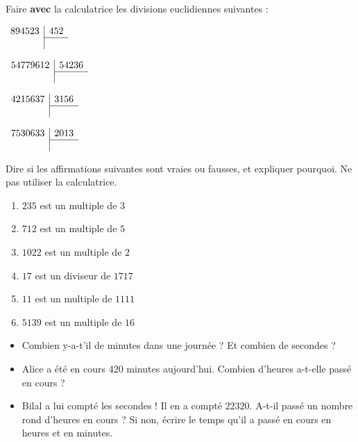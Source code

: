 \documentclass[a4paper,12pt]{article}
\begin{document}
\begin{exercice}
	Faire \textbf{avec} la calculatrice les divisions euclidiennes suivantes :
	\begin{enumerate}
		\begin{minipage}{0.45\linewidth}
			\item $\begin{array}{r|r}
					894523 & 452 \\
					\cline{2-2}
					       &
				\end{array}$
			\item $\begin{array}{r|r}
					54779612 & 54236 \\
					\cline{2-2}
					         &
				\end{array}$
		\end{minipage}
		\begin{minipage}{0.45\linewidth}
			\item $\begin{array}{r|r}
					4215637 & 3156 \\
					\cline{2-2}
					        &
				\end{array}$
			\item $\begin{array}{r|r}
					7530633 & 2013 \\
					\cline{2-2}
					        &
				\end{array}$
		\end{minipage}
	\end{enumerate}
\end{exercice}

\begin{exercice}
	Dire si les affirmations suivantes sont vraies ou fausses, et expliquer pourquoi. Ne pas utiliser la calculatrice.
	\begin{enumerate}
		\item $235$ est un multiple de $3$
		\item $712$ est un multiple de $5$
		\item $1022$ est un multiple de $2$
		\item $17$ est un diviseur de $1717$
		\item $11$ est un multiple de $1111$
		\item $5139$ est un multiple de $16$
	\end{enumerate}
\end{exercice}

\begin{exercice}
	\begin{itemize}
		\item Combien y-a-t'il de minutes dans une journée ? Et combien de secondes ?
		\item Alice a été en cours 420 minutes aujourd'hui. Combien d'heures a-t-elle passé en cours ?
		\item Bilal a lui compté les secondes ! Il en a compté $22320$. A-t-il passé un nombre rond d'heures en cours ? Si non, écrire le temps qu'il a passé en cours en heures et en minutes.
	\end{itemize}
\end{exercice}
\end{document}
